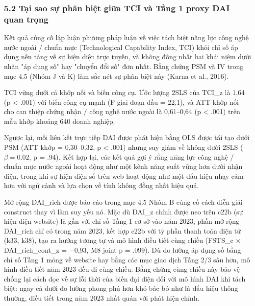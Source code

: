 \documentclass[12pt,a4paper]{article}
\begin{document}
\hypertarget{52-tux1ea1i-sao-sux1ef1-phuxe2n-biux1ec7t-giux1eefa-tci-vuxe0-tux1ea7ng-1-proxy-dai-quan-trux1ecdng}{%
\subsubsection{5.2 Tại sao sự phân biệt giữa TCI và Tầng 1 proxy DAI
quan
trọng}\label{52-tux1ea1i-sao-sux1ef1-phuxe2n-biux1ec7t-giux1eefa-tci-vuxe0-tux1ea7ng-1-proxy-dai-quan-trux1ecdng}}

Kết quả củng cố lập luận phương pháp luận về việc tách biệt năng lực
công nghệ nước ngoài / chuẩn mực (Technological Capability Index, TCI)
khỏi chỉ số áp dụng nền tảng về sự hiện diện trực tuyến, và không đồng
nhất hai khái niệm dưới nhãn "áp dụng số" hay "chuyển đổi số" đơn nhất.
Bằng chứng PSM và IV trong mục 4.5 (Nhóm J và K) làm sắc nét sự phân
biệt này (Karna et al., 2016).

TCI vững dưới cả khớp nối và biến công cụ. Ước lượng 2SLS của TCI\_z là
1,64 (p \textless{} .001) với biến công cụ mạnh (F giai đoạn đầu =
22,1), và ATT khớp nối cho can thiệp chứng nhận / công nghệ nước ngoài
là 0,61--0,64 (p \textless{} .001) trên mẫu khớp khoảng 640 doanh
nghiệp.

Ngược lại, mối liên kết trực tiếp DAI được phát hiện bằng OLS được tái
tạo dưới PSM (ATT khớp = 0,30--0,32, p \textless{} .001) nhưng suy giảm
về không dưới 2SLS (\(\beta = 0.02\), p = .94). Kết hợp lại, các kết quả
gợi ý rằng năng lực công nghệ / chuẩn mực nước ngoài hoạt động như một
kênh năng suất vững hơn dưới nhận diện, trong khi sự hiện diện số trên
web hoạt động như một dấu hiệu nhạy cảm hơn với ngữ cảnh và lựa chọn về
tính không đồng nhất hiệu quả.

Mở rộng DAI\_rich được báo cáo trong mục 4.5 Nhóm B củng cố cách diễn
giải construct thay vì làm suy yếu nó. Mặc dù DAI\_z chính được neo trên
c22b (sự hiện diện website) là gần với chỉ số Tầng 1 cơ sở vào năm 2023,
phần mở rộng DAI\_rich chỉ có trong năm 2023, kết hợp c22b với tỷ phần
thanh toán điện tử (k33, k38), tạo ra hướng tương tự và mô hình điều
tiết cùng chiều (FSTS\_c × DAI\_rich\_cont\_z = −0,93, M8 joint p =
.099). Dù đo lường áp dụng số bằng chỉ số Tầng 1 mỏng về website hay
bằng các mục giao dịch Tầng 2/3 sâu hơn, mô hình điều tiết năm 2023 đều
đi cùng chiều. Bằng chứng cùng chiều này bảo vệ chống lại cách đọc về sự
lỗi thời của biến đại diện đối với mô hình DAI khi tách biệt: ngay cả
dưới đo lường phong phú hơn khó bác bỏ như là dấu hiệu thông thường,
điều tiết trong năm 2023 nhất quán với phát hiện chính.
\end{document}
